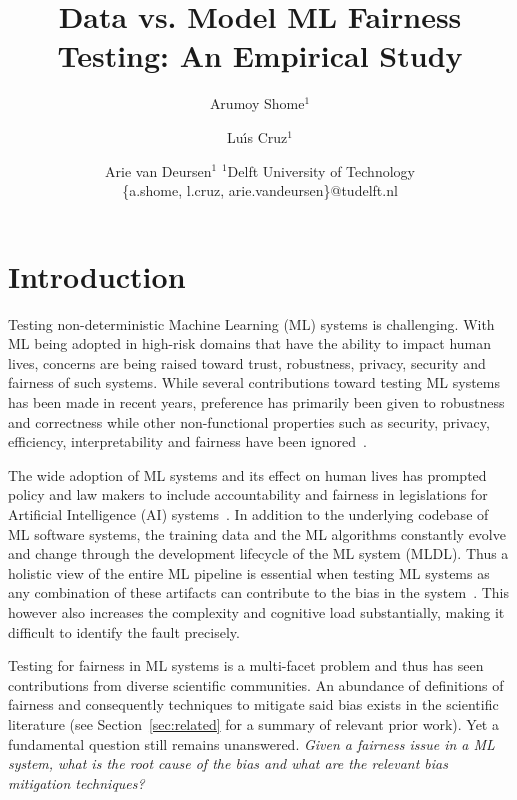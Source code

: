 \documentclass{article}
\title{Data vs. Model ML Fairness Testing: An Empirical Study}
\author{
  Arumoy Shome$^1$
  \and
  Lu{\'\i}s Cruz$^1$\and
  Arie van Deursen$^{1}$
  \affiliations
  $^1$Delft University of Technology\\
  \emails
  \{a.shome, l.cruz, arie.vandeursen\}@tudelft.nl
}
\begin{document}
\maketitle

\begin{abstract}
\end{abstract}

\section{Introduction}\label{sec:intro}

Testing non-deterministic Machine Learning (ML) systems is
challenging. With ML being adopted in high-risk domains that have the
ability to impact human lives, concerns are being raised toward trust,
robustness, privacy, security and fairness of such systems. While
several contributions toward testing ML systems has been made in
recent years, preference has primarily been given to robustness and
correctness while other non-functional properties such as security,
privacy, efficiency, interpretability and fairness have been
ignored \cite{zhang2020machine,zhang2021ignorance,mehrabi2021survey,wan2021modeling}.

The wide adoption of ML systems and its effect on human lives has
prompted policy and law makers to include accountability and fairness
in legislations for Artificial Intelligence (AI)
systems \cite{gdpr2016,aiact2021}. In addition to the underlying
codebase of ML software systems, the training data and the ML
algorithms constantly evolve and change through the development
lifecycle of the ML system (MLDL). Thus a holistic view of the entire
ML pipeline is essential when testing ML systems as any combination of
these artifacts can contribute to the bias in the
system \cite{sculley2015hidden,bosch2021engineering,hutchinson2021towards,sato2019continuous}.
This however also increases the complexity and cognitive load
substantially, making it difficult to identify the fault precisely.

Testing for fairness in ML systems is a multi-facet problem and thus
has seen contributions from diverse scientific communities. An
abundance of definitions of fairness and consequently techniques to
mitigate said bias exists in the scientific literature (see
Section \ref{sec:related} for a summary of relevant prior work). Yet a
fundamental question still remains unanswered. \emph{Given a fairness
issue in a ML system, what is the root cause of the bias and what are
the relevant bias mitigation techniques?}
\end{document}
